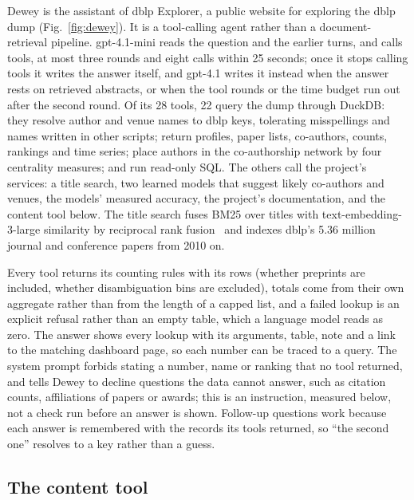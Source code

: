 \documentclass[conference]{IEEEtran}
\begin{document}
Dewey is the assistant of dblp Explorer, a public website for exploring the dblp dump (Fig.~\ref{fig:dewey}).
It is a tool-calling agent rather than a document-retrieval pipeline. gpt-4.1-mini reads the question
and the earlier turns, and calls tools, at most three rounds and eight calls within 25 seconds; once it
stops calling tools it writes the answer itself, and gpt-4.1 writes it instead when the answer rests on
retrieved abstracts, or when the tool rounds or the time budget run out after the second round. Of its 28 tools, 22 query the dump through DuckDB: they
resolve author and venue names to dblp keys, tolerating misspellings and names written in other scripts;
return profiles, paper lists, co-authors, counts, rankings and time series; place authors in the
co-authorship network by four centrality measures; and run read-only SQL. The others call the project's
services: a title search, two learned models that suggest likely co-authors and venues, the models'
measured accuracy, the project's documentation, and the content tool below. The title search fuses BM25
over titles with text-embedding-3-large similarity by reciprocal rank fusion~\cite{cormack2009rrf} and
indexes dblp's 5.36 million journal and conference papers from 2010 on.

Every tool returns its counting rules with its rows (whether preprints are included, whether
disambiguation bins are excluded), totals come from their own aggregate rather than from the length of a
capped list, and a failed lookup is an explicit refusal rather than an empty table, which a language
model reads as zero. The answer shows every lookup with its arguments, table, note and a link to the
matching dashboard page, so each number can be traced to a query. The system prompt forbids stating a
number, name or ranking that no tool returned, and tells Dewey to decline questions the data cannot
answer, such as citation counts, affiliations of papers or awards; this is an instruction, measured
below, not a check run before an answer is shown. Follow-up questions work because each answer is
remembered with the records its tools returned, so ``the second one'' resolves to a key rather than a
guess.

\subsection{The content tool}
\label{sec:content}
\end{document}

